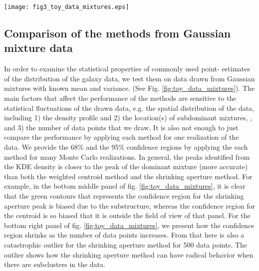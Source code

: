 \begin{figure*}
	\texttt{[image: fig3\_toy\_data\_mixtures.eps]}
	\caption{Comparison of peak finding performances of different methods by
		drawing data points (i.e. 20, 50, 100, 500) from known number of 
		Gaussian mixtures. 
		Panels from the top row contain data drawn from a single Gaussian mixture. The
		panels from the middle row contain data from two 
		 Gaussian mixtures with weight ratio = 7:3. 
	The panels from the bottom row contain data drawn from three Gaussian
	mixtures with weight ratio = 55:35:10. 
	The left column shows how 50 data points drawn from the fixed number of 
	Gaussian mixtures look like. 
	Due to the statistical nature of this exercise, we sampled the data and
	performed the analyses 50 times to
	create the 68\% and 95\% Monte Carlo confidence contours of the estimates in the
	zoomed-in view of the data in the middle
	column. The rightmost column shows how the size (median contour radius) 
	of the confidence regions vary as a
	function of the number of drawn data points from the Gaussian mixtures. 
	From the middle and the rightmost
	column, we can tell that the KDE peak estimate is the most accurate.  
		\label{fig:toy_data_mixtures}}
\end{figure*}



\subsection{Comparison of the methods from Gaussian mixture data}
In order to examine the statistical properties of commonly used point-
estimates of the distribution of the galaxy data, we test them on data drawn 
from Gaussian mixtures with known mean and variance. (See Fig.
\ref{fig:toy_data_mixtures}). The main factors that affect the performance of 
the methods are sensitive to the statistical fluctuations of the drawn data, 
e.g. the
spatial distribution of the data, including 1) the density profile and 2) the
location(s) of subdominant mixtures,
, and 3) the number of data points that we draw.
It is also not enough to just
compare the performance by applying each method for one realization of the
data. We provide the 68\% and the 95\% confidence regions by applying the
each method for many Monte Carlo realizations.
In general, the peaks identified from the KDE density is closer to the 
peak of the dominant mixture (more accurate) than 
both the weighted centroid method and the shrinking aperture method.
For example, in the bottom middle panel of fig. \ref{fig:toy_data_mixtures}, 
it is clear that the green contours
that represents the confidence region for the shrinking aperture peak is
biased due to the substructure, whereas the confidence region for the centroid 
is so biased that it is outside the field of view of that panel.
For the bottom right panel of fig. \ref{fig:toy_data_mixtures}, 
we present how the confidence region shrinks as the
number of data points increases.
From that here is also a catastrophic outlier for the shrinking 
aperture method for 500 data
points. The outlier shows how the shrinking aperture method can have
radical behavior when there are subclusters in the data.	

